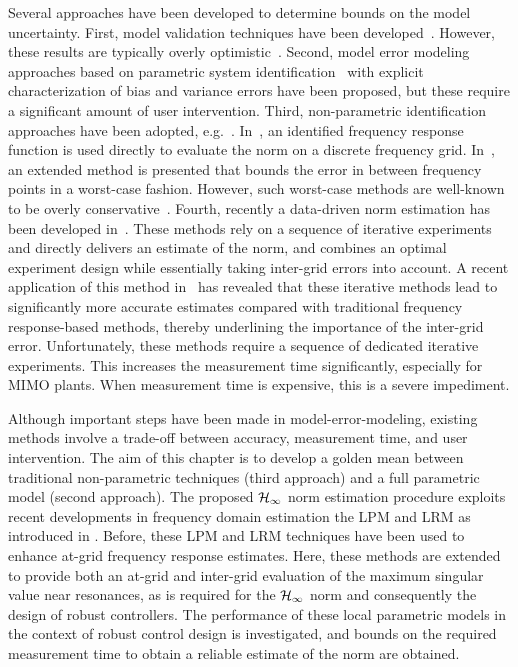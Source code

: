 Several approaches have been developed to determine bounds on the model uncertainty. 
First, model validation techniques have been developed~\citep[see e.g.][]{Smith1992,Xu1999}.
However, these results are typically overly optimistic~\citep{Oomen2009UncEstim}.
Second, model error modeling approaches based on parametric system identification~\citep{Ljung1999MEM} with explicit characterization of bias and variance errors have been proposed, but these require a significant amount of user intervention.
Third, non-parametric identification approaches have been adopted, e.g.~\citep{vandeWal2002,deVries1994}. 
In~\citep{vandeWal2002}, an identified frequency response function is used directly to evaluate the \Hinf{} norm on a discrete frequency grid. 
In~\citep{deVries1994}, an extended method is presented that bounds the error in between frequency points in a worst-case fashion. 
However, such worst-case methods are well-known to be overly conservative~\citep[Section 9.5.2]{Vinnicombe2001}. 
Fourth, recently a data-driven \Hinf{} norm estimation has been developed in~\citep{Wahlberg2010,Oomen2014ILH}.
These methods rely on a sequence of iterative experiments and directly delivers an estimate of the \Hinf{} norm, and combines an optimal experiment design while essentially taking inter-grid errors into account.
A recent application of this method in~\citep{Oomen2014ILH} has revealed that these iterative methods lead to significantly more accurate \Hinf{} estimates compared with traditional frequency response-based methods, thereby underlining the importance of the inter-grid error.
Unfortunately, these methods require a sequence of dedicated iterative experiments.
This increases the measurement time significantly, especially for \gls{MIMO} plants.
When measurement time is expensive, this is a severe impediment.

Although important steps have been made in model-error-modeling, existing methods involve a trade-off between accuracy, measurement time, and user intervention.
The aim of this chapter is to develop a golden mean between traditional non-parametric techniques (third approach) and a full parametric model (second approach).
The proposed $\mathcal{H}_{\infty}{}$ norm estimation procedure exploits recent developments in frequency domain estimation the \gls{LPM} \citep{Schoukens2009LPM} and \gls{LRM} \citep{McKelvey2012LRM} as introduced in \citep{Geerardyn2014IFAC,Geerardyn2014ISMA}.
Before, these \gls{LPM} and \gls{LRM} techniques have been used to enhance at-grid frequency response estimates.
Here, these methods are extended to provide both an at-grid and inter-grid evaluation of the maximum singular value near resonances, as is required for the $\mathcal{H}_{\infty}{}$ norm and consequently the design of robust controllers.
The performance of these local parametric models in the context of robust control design is investigated, and bounds on the required measurement time to obtain a reliable estimate of the \Hinf{} norm are obtained.

